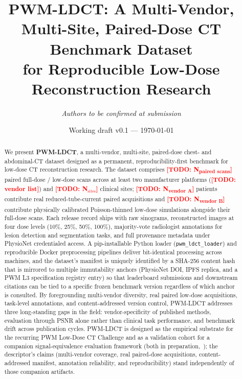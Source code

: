 \documentclass[twoside,11pt]{article}
\title{\textbf{PWM-LDCT: A Multi-Vendor, Multi-Site, Paired-Dose CT Benchmark Dataset \\ for Reproducible Low-Dose Reconstruction Research}}
\author[1,2]{\textit{Authors to be confirmed at submission}}
\affil[1]{University of Texas Southwestern Medical Center, Dallas, TX, USA}
\affil[2]{PWM Protocol Foundation}
\date{Working draft v0.1 --- \today}
\newcommand{\todo}[1]{\textcolor{red}{\textbf{[TODO: #1]}}}
\newcommand{\Nscans}{\todo{N\textsubscript{paired scans}}}
\newcommand{\NvendorA}{\todo{N\textsubscript{vendor A}}}
\newcommand{\NvendorB}{\todo{N\textsubscript{vendor B}}}
\begin{document}
\maketitle

\begin{abstract}
\noindent We present \textbf{PWM-LDCT}, a multi-vendor, multi-site, paired-dose chest- and abdominal-CT dataset designed as a permanent, reproducibility-first benchmark for low-dose CT reconstruction research. The dataset comprises \Nscans{} paired full-dose / low-dose scans across at least two manufacturer platforms (\todo{vendor list}) and \todo{N$_{\textrm{sites}}$} clinical sites; \NvendorA{} patients contribute real reduced-tube-current paired acquisitions and \NvendorB{} contribute physically calibrated Poisson-thinned low-dose simulations alongside their full-dose scans. Each release record ships with raw sinograms, reconstructed images at four dose levels (10\%, 25\%, 50\%, 100\%), majority-vote radiologist annotations for lesion detection and segmentation tasks, and full provenance metadata under PhysioNet credentialed access. A pip-installable Python loader (\texttt{pwm\_ldct\_loader}) and reproducible Docker preprocessing pipelines deliver bit-identical processing across machines, and the dataset's manifest is uniquely identified by a SHA-256 content hash that is mirrored to multiple immutability anchors (PhysioNet DOI, IPFS replica, and a PWM L3 specification registry entry) so that leaderboard submissions and downstream citations can be tied to a specific frozen benchmark version regardless of which anchor is consulted. By foregrounding multi-vendor diversity, real paired low-dose acquisitions, task-level annotations, and content-addressed version control, PWM-LDCT addresses three long-standing gaps in the field: vendor-specificity of published methods, evaluation through PSNR alone rather than clinical task performance, and benchmark drift across publication cycles. PWM-LDCT is designed as the empirical substrate for the recurring PWM Low-Dose CT Challenge and as a validation cohort for a companion signal-equivalence evaluation framework (both in preparation,~\citealt{ws4leaderboard,ws2framework}); the descriptor's claims (multi-vendor coverage, real paired-dose acquisitions, content-addressed manifest, annotation reliability, and reproducibility) stand independently of those companion artifacts.
\end{abstract}

\end{document}
